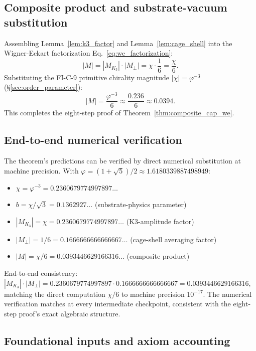 \documentclass[11pt,letterpaper]{article}
\newcommand{\phig}{\varphi}
\newcommand{\Kthree}{\ensuremath{K_3}}
\begin{document}
\subsection{Composite product and substrate-vacuum substitution}\label{sec:composite_product}

Assembling Lemma~\ref{lem:k3_factor} and Lemma~\ref{lem:cage_shell} into the Wigner-Eckart factorization Eq.~\eqref{eq:we_factorization}:
\begin{equation}\label{eq:composite_product}
|M| = |M_{\Kthree}| \cdot |M_\perp| = \chi \cdot \frac{1}{6} = \frac{\chi}{6}.
\end{equation}
Substituting the FI-C-9 primitive chirality magnitude $|\chi| = \phig^{-3}$ (\S\ref{sec:order_parameter}):
\[
|M| = \frac{\phig^{-3}}{6} \approx \frac{0.236}{6} \approx 0.0394.
\]
This completes the eight-step proof of Theorem~\ref{thm:composite_cap_we}.

\subsection{End-to-end numerical verification}\label{sec:numerical_verification}

The theorem's predictions can be verified by direct numerical substitution at machine precision. With $\phig = (1+\sqrt{5})/2 \approx 1.6180339887498949$:
\begin{itemize}\setlength\itemsep{0.2em}
    \item $\chi = \phig^{-3} = 0.2360679774997897 \ldots$
    \item $b = \chi/\sqrt{3} = 0.1362927\ldots$ (substrate-physics parameter)
    \item $|M_{\Kthree}| = \chi = 0.2360679774997897 \ldots$ (K3-amplitude factor)
    \item $|M_\perp| = 1/6 = 0.1666666666666667 \ldots$ (cage-shell averaging factor)
    \item $|M| = \chi/6 = 0.0393446629166316 \ldots$ (composite product)
\end{itemize}
End-to-end consistency: $|M_{\Kthree}| \cdot |M_\perp| = 0.2360679774997897 \cdot 0.1666666666666667 = 0.0393446629166316$, matching the direct computation $\chi/6$ to machine precision $10^{-17}$. The numerical verification matches at every intermediate checkpoint, consistent with the eight-step proof's exact algebraic structure.

\subsection{Foundational inputs and axiom accounting}\label{sec:fi_axiom_accounting}
\end{document}
